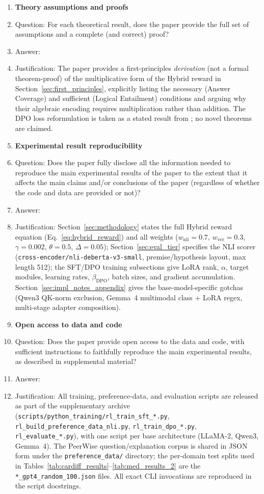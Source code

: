 \begin{enumerate}
\item {\bf Theory assumptions and proofs}
    \item[] Question: For each theoretical result, does the paper provide the full set of assumptions and a complete (and correct) proof?
    \item[] Answer: \answerNA{}
    \item[] Justification: The paper provides a first-principles \emph{derivation} (not a formal theorem-proof) of the multiplicative form of the Hybrid reward in Section~\ref{sec:first_principles}, explicitly listing the necessary (Answer Coverage) and sufficient (Logical Entailment) conditions and arguing why their algebraic encoding requires multiplication rather than addition. The DPO loss reformulation is taken as a stated result from \cite{rafailov2023direct}; no novel theorems are claimed.

\item {\bf Experimental result reproducibility}
    \item[] Question: Does the paper fully disclose all the information needed to reproduce the main experimental results of the paper to the extent that it affects the main claims and/or conclusions of the paper (regardless of whether the code and data are provided or not)?
    \item[] Answer: \answerYes{}
    \item[] Justification: Section~\ref{sec:methodology} states the full Hybrid reward equation (Eq.~\ref{eq:hybrid_reward}) and all weights ($w_\text{nli}{=}0.7$, $w_\text{ver}{=}0.3$, $\gamma{=}0.002$, $\theta{=}0.5$, $\Delta{=}0.05$); Section~\ref{sec:eval_tier} specifies the NLI scorer (\texttt{cross-encoder/nli-deberta-v3-small}, premise/hypothesis layout, max length 512); the SFT/DPO training subsections give LoRA rank, $\alpha$, target modules, learning rates, $\beta_{\text{DPO}}$, batch sizes, and gradient accumulation. Section~\ref{sec:impl_notes_appendix} gives the base-model-specific gotchas (Qwen3 QK-norm exclusion, Gemma~4 multimodal class + LoRA regex, multi-stage adapter composition).

\item {\bf Open access to data and code}
    \item[] Question: Does the paper provide open access to the data and code, with sufficient instructions to faithfully reproduce the main experimental results, as described in supplemental material?
    \item[] Answer: \answerYes{}
    \item[] Justification: All training, preference-data, and evaluation scripts are released as part of the supplementary archive (\texttt{scripts/python\_training/rl\_train\_sft\_*.py}, \texttt{rl\_build\_preference\_data\_nli.py}, \texttt{rl\_train\_dpo\_*.py}, \texttt{rl\_evaluate\_*.py}), with one script per base architecture (LLaMA-2, Qwen3, Gemma~4). The PeerWise question/explanation corpus is shared in JSON form under the \texttt{preference\_data/} directory; the per-domain test splits used in Tables~\ref{tab:cardiff_results}--\ref{tab:med_results_2} are the \texttt{*\_gpt4\_random\_100.json} files. All exact CLI invocations are reproduced in the script docstrings.


\end{enumerate}
